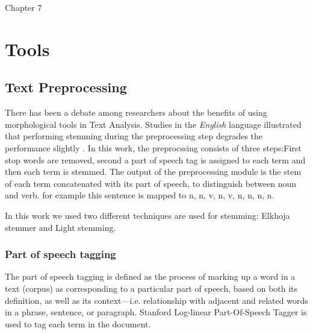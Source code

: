 Chapter 7

\chapter{Tools} %

\label{tools} %


\section{Text Preprocessing}
There has been a debate among researchers about the benefits of using morphological tools in Text Analysis. Studies in the \textit{English}
language illustrated that performing stemming during the preprocessing step degrades the performance slightly \citep{pre_8} \citep{pre_9}. 
In this work, the preprocssing consists of three steps:First stop words are removed, second a part of speech tag is assigned to each term and then each term is stemmed.
The output of the preprocessing module is the stem of each term concatenated with its part of speech, to distinguish between noun and verb. for example this sentence  is mapped to n, n, v, n, v, n, n, n, n.

In this work we used two different techniques are used for stemming: Elkhoja stemmer and Light stemming.

\subsection{Part of speech tagging}

The part of speech tagging is defined as  the process of marking up a word in a text (corpus) as corresponding to a particular part of speech, based on both its definition, as well as its context—i.e. relationship with adjacent and related words in a phrase, sentence, or paragraph. 
Stanford Log-linear Part-Of-Speech Tagger \citep{pre_1} \citep{pre_2} is used to tag each term in the document.


